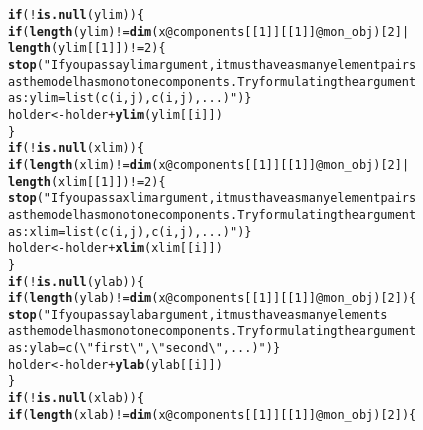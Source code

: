 \documentclass[fleqn,10pt]{olplainarticle}\usepackage[]{graphicx}\usepackage[]{color}
\makeatletter
\newcommand{\hlnum}[1]{\textcolor[rgb]{0.686,0.059,0.569}{#1}}%
\newcommand{\hlstr}[1]{\textcolor[rgb]{0.192,0.494,0.8}{#1}}%
\newcommand{\hlopt}[1]{\textcolor[rgb]{0,0,0}{#1}}%
\newcommand{\hlstd}[1]{\textcolor[rgb]{0.345,0.345,0.345}{#1}}%
\newcommand{\hlkwa}[1]{\textcolor[rgb]{0.161,0.373,0.58}{\textbf{#1}}}%
\newcommand{\hlkwb}[1]{\textcolor[rgb]{0.69,0.353,0.396}{#1}}%
\newcommand{\hlkwc}[1]{\textcolor[rgb]{0.333,0.667,0.333}{#1}}%
\newcommand{\hlkwd}[1]{\textcolor[rgb]{0.737,0.353,0.396}{\textbf{#1}}}%
\newenvironment{kframe}{%
 \def\at@end@of@kframe{}%
 \ifinner\ifhmode%
  \def\at@end@of@kframe{\end{minipage}}%
  \begin{minipage}{\columnwidth}%
 \fi\fi%
 \def\FrameCommand##1{\hskip\@totalleftmargin \hskip-\fboxsep
 \colorbox{shadecolor}{##1}\hskip-\fboxsep
     \hskip-\linewidth \hskip-\@totalleftmargin \hskip\columnwidth}%
 \MakeFramed {\advance\hsize-\width
   \@totalleftmargin\z@ \linewidth\hsize
   \@setminipage}}%
 {\par\unskip\endMakeFramed%
 \at@end@of@kframe}
\newenvironment{knitrout}{}{} %
\makeatother
\begin{document}
\begin{appendices}
\begin{knitrout}
\begin{kframe}
\begin{alltt}
                \hlkwa{if}\hlstd{(}\hlopt{!}\hlkwd{is.null}\hlstd{(ylim))\{}
                  \hlkwa{if}\hlstd{(}\hlkwd{length}\hlstd{(ylim)} \hlopt{!=} \hlkwd{dim}\hlstd{( x}\hlopt{@}\hlkwc{components}\hlstd{[[}\hlnum{1}\hlstd{]][[}\hlnum{1}\hlstd{]]}\hlopt{@}\hlkwc{mon_obj} \hlstd{)[}\hlnum{2}\hlstd{]} \hlopt{|}
                     \hlkwd{length}\hlstd{(ylim[[}\hlnum{1}\hlstd{]])} \hlopt{!=} \hlnum{2} \hlstd{)\{}
                    \hlkwd{stop}\hlstd{(}\hlstr{"If you pass a ylim argument, it must have as many element pairs 
                         as the model has monotone components. Try formulating the argument
                         as: ylim = list(c(i,j), c(i,j), ...)"}\hlstd{)\}}
                  \hlstd{holder} \hlkwb{<-} \hlstd{holder} \hlopt{+} \hlkwd{ylim}\hlstd{(ylim[[i]])}
                \hlstd{\}}
                \hlkwa{if}\hlstd{(}\hlopt{!}\hlkwd{is.null}\hlstd{(xlim))\{}
                  \hlkwa{if}\hlstd{(}\hlkwd{length}\hlstd{(xlim)} \hlopt{!=} \hlkwd{dim}\hlstd{( x}\hlopt{@}\hlkwc{components}\hlstd{[[}\hlnum{1}\hlstd{]][[}\hlnum{1}\hlstd{]]}\hlopt{@}\hlkwc{mon_obj} \hlstd{)[}\hlnum{2}\hlstd{]} \hlopt{|}
                     \hlkwd{length}\hlstd{(xlim[[}\hlnum{1}\hlstd{]])} \hlopt{!=} \hlnum{2} \hlstd{)\{}
                    \hlkwd{stop}\hlstd{(}\hlstr{"If you pass a xlim argument, it must have as many element pairs 
                         as the model has monotone components. Try formulating the argument
                         as: xlim = list(c(i,j), c(i,j), ...)"}\hlstd{)\}}
                  \hlstd{holder} \hlkwb{<-} \hlstd{holder} \hlopt{+} \hlkwd{xlim}\hlstd{(xlim[[i]])}
                \hlstd{\}}
                \hlkwa{if}\hlstd{(}\hlopt{!}\hlkwd{is.null}\hlstd{(ylab))\{}
                  \hlkwa{if}\hlstd{(}\hlkwd{length}\hlstd{(ylab)} \hlopt{!=} \hlkwd{dim}\hlstd{( x}\hlopt{@}\hlkwc{components}\hlstd{[[}\hlnum{1}\hlstd{]][[}\hlnum{1}\hlstd{]]}\hlopt{@}\hlkwc{mon_obj} \hlstd{)[}\hlnum{2}\hlstd{])\{}
                    \hlkwd{stop}\hlstd{(}\hlstr{"If you pass a ylab argument, it must have as many elements 
                         as the model has monotone components. Try formulating the argument
                         as: ylab = c(\textbackslash{}"first\textbackslash{}",\textbackslash{}"second\textbackslash{}",...)"}\hlstd{)\}}
                  \hlstd{holder} \hlkwb{<-} \hlstd{holder} \hlopt{+} \hlkwd{ylab}\hlstd{(ylab[[i]])}
                \hlstd{\}}
                \hlkwa{if}\hlstd{(}\hlopt{!}\hlkwd{is.null}\hlstd{(xlab))\{}
                  \hlkwa{if}\hlstd{(}\hlkwd{length}\hlstd{(xlab)} \hlopt{!=} \hlkwd{dim}\hlstd{( x}\hlopt{@}\hlkwc{components}\hlstd{[[}\hlnum{1}\hlstd{]][[}\hlnum{1}\hlstd{]]}\hlopt{@}\hlkwc{mon_obj} \hlstd{)[}\hlnum{2}\hlstd{])\{}

\end{alltt}
\end{kframe}
\end{knitrout}
\end{appendices}
\end{document}
